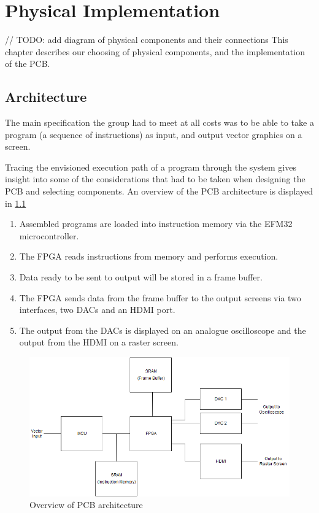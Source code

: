 \chapter{Physical Implementation}

// TODO: add diagram of physical components and their connections
This chapter describes our choosing of physical components, and the implementation of the PCB.

\section{Architecture}
The main specification the group had to meet at all costs was to be able to take a program (a sequence of instructions) as input, and output vector graphics on a screen.

Tracing the envisioned execution path of a program through the system gives insight into some of the considerations that had to be taken when designing the PCB and selecting components. An overview of the PCB architecture is displayed in \ref{fig:PCB_Overview}

\begin{enumerate}
\item Assembled \vthreek programs are loaded into instruction memory via the EFM32 microcontroller.
\item The FPGA reads instructions from memory and performs execution.
\item Data ready to be sent to output will be stored in a frame buffer.
\item The FPGA sends data from the frame buffer to the output screens via two interfaces, two DACs and an HDMI port.
\item The output from the DACs is displayed on an analogue oscilloscope and the output from the HDMI on a raster screen.
\end{enumerate}

\begin{figure}[h!]
\centering
\includegraphics[scale = 0.4]{images/PCB_Overview.png}
\caption{Overview of PCB architecture}
\label{fig:PCB_Overview}
\end{figure}

